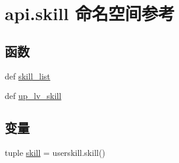 \hypertarget{namespaceapi_1_1skill}{\section{api.\-skill 命名空间参考}
\label{namespaceapi_1_1skill}
}
\subsection*{函数}
\begin{DoxyCompactItemize}
\item 
def \hyperlink{namespaceapi_1_1skill_a41a50488e77539f50f49866f9e021730}{skill\-\_\-list}
\item 
def \hyperlink{namespaceapi_1_1skill_aec8d25268e8eaf3c116049eb41025b71}{up\-\_\-lv\-\_\-skill}
\end{DoxyCompactItemize}
\subsection*{变量}
\begin{DoxyCompactItemize}
\item 
tuple \hyperlink{namespaceapi_1_1skill_a3d7434a9563cba7b959b3e8497b2b52d}{skill} = userskill.\-skill()
\end{DoxyCompactItemize}


